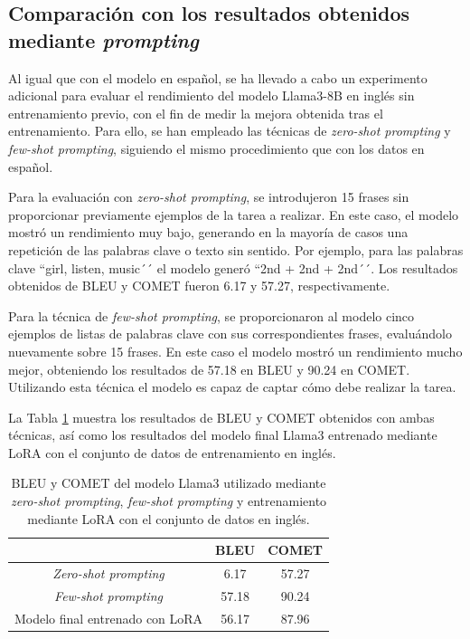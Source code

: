 \documentclass[11pt,spanish,listoffigures,listoftables]{tfgetsinf}
\begin{document}
\subsection{Comparación con los resultados obtenidos mediante \textit{prompting}}

Al igual que con el modelo en español, se ha llevado a cabo un experimento adicional para evaluar el rendimiento del modelo Llama3-8B en inglés sin entrenamiento previo, con el fin de medir la mejora obtenida tras el entrenamiento. Para ello, se han empleado las técnicas de \textit{zero-shot prompting} y \textit{few-shot prompting}, siguiendo el mismo procedimiento que con los datos en español.

Para la evaluación con \textit{zero-shot prompting}, se introdujeron 15 frases sin proporcionar previamente ejemplos de la tarea a realizar. En este caso, el modelo mostró un rendimiento muy bajo, generando en la mayoría de casos una repetición de las palabras clave o texto sin sentido. Por ejemplo, para las palabras clave ``girl, listen, music´´ el modelo generó ``2nd + 2nd + 2nd´´. Los resultados obtenidos de BLEU y COMET fueron 6.17 y 57.27, respectivamente.

Para la técnica de \textit{few-shot prompting}, se proporcionaron al modelo cinco ejemplos de listas de palabras clave con sus correspondientes frases, evaluándolo nuevamente sobre 15 frases. En este caso el modelo mostró un rendimiento mucho mejor, obteniendo los resultados de 57.18 en BLEU y 90.24 en COMET. Utilizando esta técnica el modelo es capaz de captar cómo debe realizar la tarea.

La Tabla \ref{tab:promptingInglés} muestra los resultados de BLEU y COMET obtenidos con ambas técnicas, así como los resultados del modelo final Llama3 entrenado mediante LoRA con el conjunto de datos de entrenamiento en inglés.

\begin{table}[!h]
\caption{BLEU y COMET del modelo Llama3 utilizado mediante \textit{zero-shot prompting}, \textit{few-shot prompting} y entrenamiento mediante LoRA con el conjunto de datos en inglés.}
\begin{center}
\begin{tabular}{ c | c c }
	\ & BLEU & COMET \\
	\hline
	\hline
	\textit{Zero-shot prompting} & 6.17 & 57.27  \\
	\textit{Few-shot prompting} & 57.18 & 90.24 \\
	Modelo final entrenado con LoRA & 56.17 & 87.96 \\

\end{tabular}
\end{center}
\label{tab:promptingInglés}
\end{table}
\end{document}
